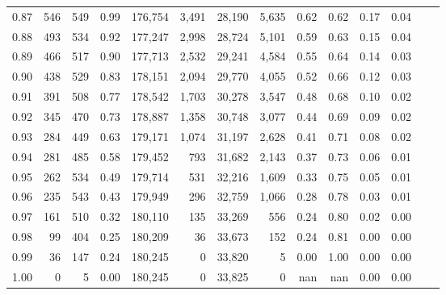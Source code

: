 \begin{tabular}{rrrrrrrrrrrrrr}
0.87 &    546 &  549 &    0.99 &  176,754 &    3,491 &  28,190 &   5,635 &  0.62 &  0.62 &  0.17 &      0.04 \\
0.88 &    493 &  534 &    0.92 &  177,247 &    2,998 &  28,724 &   5,101 &  0.59 &  0.63 &  0.15 &      0.04 \\
0.89 &    466 &  517 &    0.90 &  177,713 &    2,532 &  29,241 &   4,584 &  0.55 &  0.64 &  0.14 &      0.03 \\
0.90 &    438 &  529 &    0.83 &  178,151 &    2,094 &  29,770 &   4,055 &  0.52 &  0.66 &  0.12 &      0.03 \\
0.91 &    391 &  508 &    0.77 &  178,542 &    1,703 &  30,278 &   3,547 &  0.48 &  0.68 &  0.10 &      0.02 \\
0.92 &    345 &  470 &    0.73 &  178,887 &    1,358 &  30,748 &   3,077 &  0.44 &  0.69 &  0.09 &      0.02 \\
0.93 &    284 &  449 &    0.63 &  179,171 &    1,074 &  31,197 &   2,628 &  0.41 &  0.71 &  0.08 &      0.02 \\
0.94 &    281 &  485 &    0.58 &  179,452 &      793 &  31,682 &   2,143 &  0.37 &  0.73 &  0.06 &      0.01 \\
0.95 &    262 &  534 &    0.49 &  179,714 &      531 &  32,216 &   1,609 &  0.33 &  0.75 &  0.05 &      0.01 \\
0.96 &    235 &  543 &    0.43 &  179,949 &      296 &  32,759 &   1,066 &  0.28 &  0.78 &  0.03 &      0.01 \\
0.97 &    161 &  510 &    0.32 &  180,110 &      135 &  33,269 &     556 &  0.24 &  0.80 &  0.02 &      0.00 \\
0.98 &     99 &  404 &    0.25 &  180,209 &       36 &  33,673 &     152 &  0.24 &  0.81 &  0.00 &      0.00 \\
0.99 &     36 &  147 &    0.24 &  180,245 &        0 &  33,820 &       5 &  0.00 &  1.00 &  0.00 &      0.00 \\
1.00 &      0 &    5 &    0.00 &  180,245 &        0 &  33,825 &       0 &   nan &   nan &  0.00 &      0.00 \\
\bottomrule
\end{tabular}
